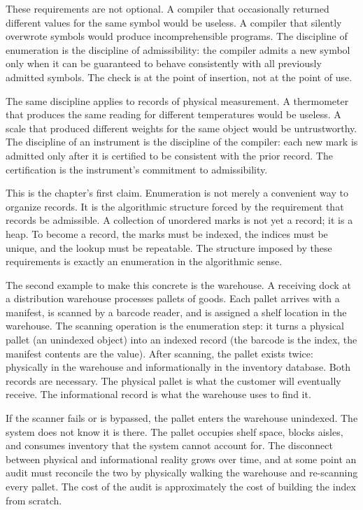 \begin{chapteressay}
These requirements are not optional. A compiler that occasionally returned
different values for the same symbol would be useless. A compiler that
silently overwrote symbols would produce incomprehensible programs. The
discipline of enumeration is the discipline of admissibility: the compiler
admits a new symbol only when it can be guaranteed to behave consistently
with all previously admitted symbols. The check is at the point of
insertion, not at the point of use.

The same discipline applies to records of physical measurement. A
thermometer that produces the same reading for different temperatures
would be useless. A scale that produced different weights for the same
object would be untrustworthy. The discipline of an instrument is the
discipline of the compiler: each new mark is admitted only after it is
certified to be consistent with the prior record. The certification is the
instrument's commitment to admissibility.

This is the chapter's first claim. Enumeration is not merely a convenient
way to organize records. It is the algorithmic structure forced by the
requirement that records be admissible. A collection of unordered marks
is not yet a record; it is a heap. To become a record, the marks must be
indexed, the indices must be unique, and the lookup must be repeatable.
The structure imposed by these requirements is exactly an enumeration in
the algorithmic sense.

The second example to make this concrete is the warehouse. A receiving
dock at a distribution warehouse processes pallets of goods. Each pallet
arrives with a manifest, is scanned by a barcode reader, and is
assigned a shelf location in the warehouse. The scanning operation is
the enumeration step: it turns a physical pallet (an unindexed object)
into an indexed record (the barcode is the index, the manifest contents
are the value). After scanning, the pallet exists twice: physically in
the warehouse and informationally in the inventory database. Both
records are necessary. The physical pallet is what the customer will
eventually receive. The informational record is what the warehouse uses
to find it.

If the scanner fails or is bypassed, the pallet enters the warehouse
unindexed. The system does not know it is there. The pallet occupies
shelf space, blocks aisles, and consumes inventory that the system
cannot account for. The disconnect between physical and informational
reality grows over time, and at some point an audit must reconcile the
two by physically walking the warehouse and re-scanning every pallet.
The cost of the audit is approximately the cost of building the index
from scratch.


\end{chapteressay}
